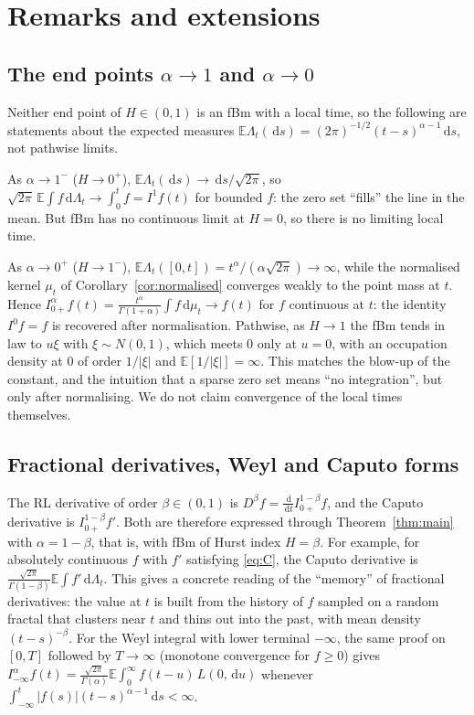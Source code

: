 \documentclass[11pt]{article}
\theoremstyle{remark}
\theoremstyle{definition}
\newcommand{\E}{\mathbb{E}}
\newcommand{\dd}{\,\mathrm{d}}
\newcommand{\Ia}{I^{\alpha}_{0+}}
\begin{document}
\section{Remarks and extensions}\label{sec:remarks}

\subsection{The end points $\alpha\to1$ and $\alpha\to0$}\label{sec:endpoints}
Neither end point of $H\in(0,1)$ is an fBm with a local time, so the following are statements about the expected measures $\E\Lambda_t(\dd s)=(2\pi)^{-1/2}(t-s)^{\alpha-1}\dd s$, not pathwise limits.

As $\alpha\to1^-$ ($H\to0^+$), $\E\Lambda_t(\dd s)\to\dd s/\sqrt{2\pi}$, so $\sqrt{2\pi}\,\E\int f\dd\Lambda_t\to\int_0^t f=I^1f(t)$ for bounded $f$: the zero set ``fills'' the line in the mean. But fBm has no continuous limit at $H=0$, so there is no limiting local time.

As $\alpha\to0^+$ ($H\to1^-$), $\E\Lambda_t([0,t])=t^\alpha/(\alpha\sqrt{2\pi})\to\infty$, while the normalised kernel $\mu_t$ of Corollary~\ref{cor:normalised} converges weakly to the point mass at $t$. Hence $\Ia f(t)=\frac{t^\alpha}{\Gamma(1+\alpha)}\int f\dd\mu_t\to f(t)$ for $f$ continuous at $t$: the identity $I^0f=f$ is recovered after normalisation. Pathwise, as $H\to1$ the fBm tends in law to $u\xi$ with $\xi\sim N(0,1)$, which meets $0$ only at $u=0$, with an occupation density at $0$ of order $1/|\xi|$ and $\E[1/|\xi|]=\infty$. This matches the blow-up of the constant, and the intuition that a sparse zero set means ``no integration'', but only after normalising. We do not claim convergence of the local times themselves.

\subsection{Fractional derivatives, Weyl and Caputo forms}\label{sec:weyl}
The RL derivative of order $\beta\in(0,1)$ is $D^\beta f=\frac{\dd}{\dd t}I^{1-\beta}_{0+}f$, and the Caputo derivative is $I^{1-\beta}_{0+}f'$. Both are therefore expressed through Theorem~\ref{thm:main} with $\alpha=1-\beta$, that is, with fBm of Hurst index $H=\beta$. For example, for absolutely continuous $f$ with $f'$ satisfying \eqref{eq:C}, the Caputo derivative is $\frac{\sqrt{2\pi}}{\Gamma(1-\beta)}\E\int f'\dd\Lambda_t$. This gives a concrete reading of the ``memory'' of fractional derivatives: the value at $t$ is built from the history of $f$ sampled on a random fractal that clusters near $t$ and thins out into the past, with mean density $(t-s)^{-\beta}$. For the Weyl integral with lower terminal $-\infty$, the same proof on $[0,T]$ followed by $T\to\infty$ (monotone convergence for $f\ge0$) gives $I^\alpha_{-\infty}f(t)=\frac{\sqrt{2\pi}}{\Gamma(\alpha)}\E\int_0^\infty f(t-u)\,L(0,\dd u)$ whenever $\int_{-\infty}^t|f(s)|(t-s)^{\alpha-1}\dd s<\infty$.
\end{document}
